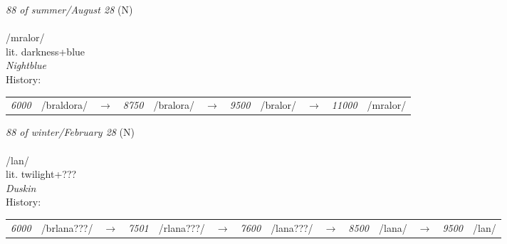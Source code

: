 \vspace{15pt}
\begin{nopagebreak}
 \textit{88 of summer/August 28} (N)\\
\\
\noindent /mr{\textprimstress}alor/\\
\noindent lit. darkness+blue\\
\noindent \textit{Nightblue}\\


\noindent History:

\vspace{-0pt}
\hspace{40pt}
\begin{tabular}{ccc}
\textit{6000} & /braldora/&$\rightarrow$ & \textit{8750} & /bralora/&$\rightarrow$ & \textit{9500} & /bralor/&$\rightarrow$ & \textit{11000} & /mralor/& \\
\end{tabular}

\vspace{20pt}\hline

\end{nopagebreak}
\filbreak



\vspace{15pt}
\begin{nopagebreak}
 \textit{88 of winter/February 28} (N)\\
\\
\noindent /l{\textprimstress}an/\\
\noindent lit. twilight+???\\
\noindent \textit{Duskin}\\


\noindent History:

\vspace{-0pt}
\hspace{40pt}
\begin{tabular}{ccc}
\textit{6000} & /brlana???/&$\rightarrow$ & \textit{7501} & /rlana???/&$\rightarrow$ & \textit{7600} & /lana???/&$\rightarrow$ & \textit{8500} & /lana/&$\rightarrow$ & \textit{9500} & /lan/& \\
\end{tabular}

\vspace{20pt}\hline

\end{nopagebreak}
\filbreak



